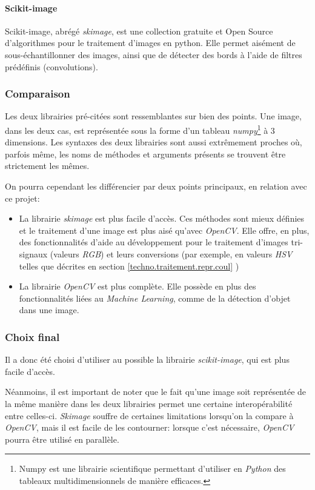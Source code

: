 \paragraph{Scikit-image}
Scikit-image\autocite{lib:skimage}, abrégé \textit{skimage}, est une collection gratuite et Open Source d'algorithmes pour le traitement d'images en python. Elle permet aisément de sous-échantillonner des images, ainsi que de détecter des bords à l'aide de filtres prédéfinis (convolutions).

\subsubsection{Comparaison}
Les deux librairies pré-citées sont ressemblantes sur bien des points. Une image, dans les deux cas, est représentée sous la forme d'un tableau \textit{numpy}\footnote{Numpy est une librairie scientifique permettant d'utiliser en \textit{Python} des tableaux multidimensionnels de manière efficaces.\autocite{lib:numpy}} à 3 dimensions. Les syntaxes des deux librairies sont aussi extrêmement proches où, parfois même, les noms de méthodes et arguments présents se trouvent être strictement les mêmes.

On pourra cependant les différencier par deux points principaux, en relation avec ce projet:
\begin{itemize}
    \item La librairie \textit{skimage} est plus facile d'accès. Ces méthodes sont mieux définies et le traitement d'une image est plus aisé qu'avec \textit{OpenCV}. Elle offre, en plus, des fonctionnalités d'aide au développement pour le traitement d'images tri-signaux (valeurs \textit{RGB}) et leurs conversions (par exemple, en valeurs \textit{HSV} telles que décrites en section \ref{techno.traitement.repr.coul} )
    \item La librairie \textit{OpenCV} est plus complète. Elle possède en plus des fonctionnalités liées au \textit{Machine Learning}, comme de la détection d'objet dans une image.
\end{itemize}

\subsubsection{Choix final}
Il a donc été choisi d'utiliser au possible la librairie \textit{scikit-image}, qui est plus facile d'accès. 

Néanmoins, il est important de noter que le fait qu'une image soit représentée de la même manière dans les deux librairies permet une certaine interopérabilité entre celles-ci. \textit{Skimage} souffre de certaines limitations lorsqu'on la compare à \textit{OpenCV}, mais il est facile de les contourner: lorsque c'est nécessaire, \textit{OpenCV} pourra être utilisé en parallèle.

